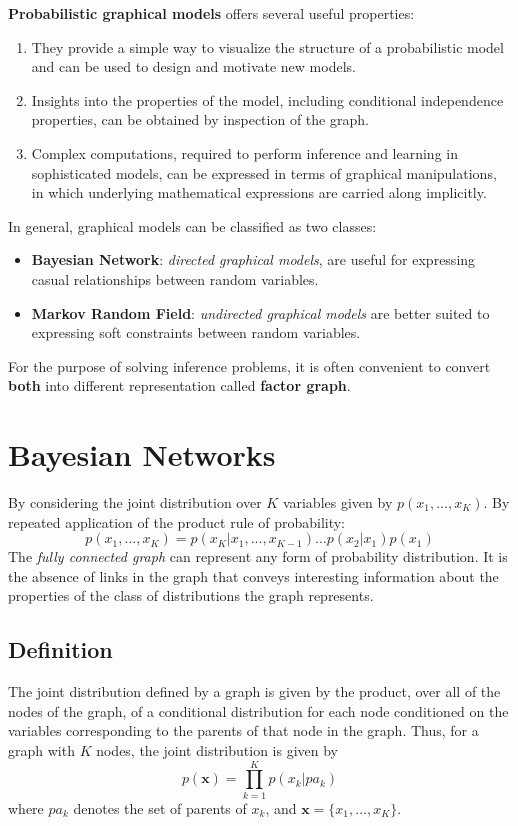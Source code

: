 \documentclass[a3paper, 12pt]{book} %
\begin{document}
\textbf{Probabilistic graphical models} offers several useful properties:
\begin{enumerate}
	\item They provide a simple way to visualize the structure of a probabilistic model and can be used to design and motivate new models.
	\item Insights into the properties of the model, including conditional independence properties, can be obtained by inspection of the graph.
	\item Complex computations, required to perform inference and learning in sophisticated models, can be expressed in terms of graphical manipulations, in which underlying mathematical expressions are carried along implicitly.
\end{enumerate} 
In general, graphical models can be classified as two classes:
\begin{itemize}
	\item \textbf{Bayesian Network}: \emph{directed graphical models}, are useful for expressing casual relationships between random variables.
	\item \textbf{Markov Random Field}: \emph{undirected graphical models} are better suited to expressing soft constraints between random variables.
\end{itemize}
For the purpose of solving inference problems, it is often convenient to convert \textbf{both} into different representation called \textbf{factor graph}.

\section{Bayesian Networks}
By considering the joint distribution over $K$ variables given by $p(x_1,...,x_K)$. By repeated application of the product rule of probability:
\begin{equation}
p(x_1,...,x_K)=p(x_K|x_1,...,x_{K-1})...p(x_2|x_1)p(x_1)
\end{equation}
The \emph{fully connected graph} can represent any form of probability distribution. It is the absence of links in the graph that conveys interesting information about the properties of the class of distributions the graph represents.

\subsection{Definition}
The joint distribution
defined by a graph is given by the product, over all of the nodes of the graph, of
a conditional distribution for each node conditioned on the variables corresponding
to the parents of that node in the graph. Thus, for a graph with $K$ nodes, the joint
distribution is given by 
\begin{equation}
p(\mathbf{x})=\prod_{k=1}^{K}{p(x_k|pa_k)}
\end{equation}
where $pa_k$ denotes the set of parents of $x_k$, and $\mathbf{x}=\{x_1,...,x_K\}$.
\end{document}
